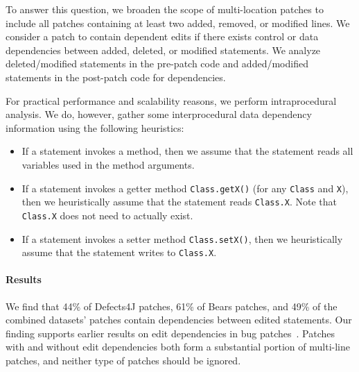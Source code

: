 \documentclass[sigconf, timestamp-false, anonymous=true]{acmart}
\begin{document}
To answer this question, we broaden the scope of multi-location patches to 
include all patches containing at least two added, removed, or modified lines.
We consider a patch to contain dependent edits if there exists 
control or data dependencies between added, deleted, or modified statements.
We analyze deleted/modified statements in the pre-patch code 
and added/modified statements in the post-patch code for dependencies.
  
For practical performance and scalability reasons, 
we perform intraprocedural analysis. 
We do, however, gather some interprocedural data dependency information 
using the following heuristics:
\begin{itemize}
	\item If a statement invokes a method, then we assume that
	the statement reads all variables used in the method arguments.
	\item If a statement invokes a getter method \texttt{Class.getX()} 
	(for any \texttt{Class} and \texttt{X}), then we heuristically 
	assume that the statement reads \texttt{Class.X}. 
	Note that \texttt{Class.X} does not need to actually exist.
	\item If a statement invokes a setter method \texttt{Class.setX()}, 
	then we heuristically assume that the statement writes to \texttt{Class.X}. 
\end{itemize}

\paragraph{Results}

We find that 44\% of Defects4J patches, 61\% of Bears patches, 
and 49\% of the combined datasets' patches contain dependencies 
between edited statements.
Our finding supports earlier results on edit dependencies in 
bug patches~\cite{zhong2015}.
Patches with and without edit dependencies both form a substantial
portion of multi-line patches,
and neither type of patches should be ignored.
\end{document}
